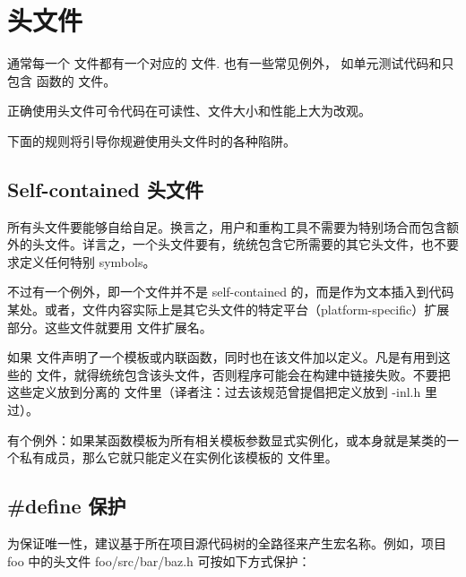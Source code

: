 \chapter{头文件}

通常每一个  文件都有一个对应的  文件. 也有一些常见例外， 如单元测试代码和只包含  函数的 文件。

正确使用头文件可令代码在可读性、文件大小和性能上大为改观。

下面的规则将引导你规避使用头文件时的各种陷阱。

\section{Self-contained 头文件} \label{self-contained-headers}


所有头文件要能够自给自足。换言之，用户和重构工具不需要为特别场合而包含额外的头文件。详言之，一个头文件要有，统统包含它所需要的其它头文件，也不要求定义任何特别 symbols。

不过有一个例外，即一个文件并不是 self-contained 的，而是作为文本插入到代码某处。或者，文件内容实际上是其它头文件的特定平台（platform-specific）扩展部分。这些文件就要用 文件扩展名。

如果  文件声明了一个模板或内联函数，同时也在该文件加以定义。凡是有用到这些的  文件，就得统统包含该头文件，否则程序可能会在构建中链接失败。不要把这些定义放到分离的  文件里（译者注：过去该规范曾提倡把定义放到 -inl.h 里过）。

有个例外：如果某函数模板为所有相关模板参数显式实例化，或本身就是某类的一个私有成员，那么它就只能定义在实例化该模板的  文件里。

\section{#define 保护} \label{pragma-once-guard}


为保证唯一性，建议基于所在项目源代码树的全路径来产生宏名称。例如，项目 foo 中的头文件 foo/src/bar/baz.h 可按如下方式保护：

